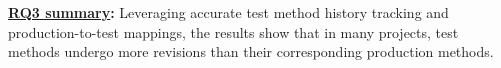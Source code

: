 



\begin{tcolorbox}
\noindent\textbf{\underline{RQ3 summary}:}
Leveraging accurate test method history tracking and production-to-test mappings, the results show that in many projects, test methods undergo more revisions than their corresponding production methods.
\end{tcolorbox}
